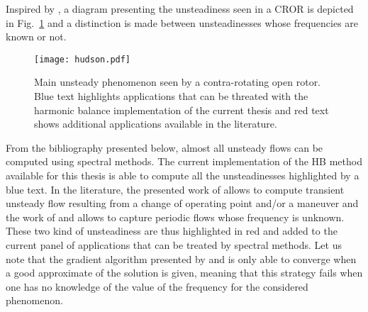 
Inspired by \citet{Hodson1998},
a diagram presenting the unsteadiness seen in 
a CROR is depicted in Fig.~\ref{fig:hudson} and a distinction
is made between unsteadinesses whose frequencies are
known or not.
\begin{figure}[htbp]
  \centering
  \texttt{[image: hudson.pdf]}
  \caption{Main unsteady phenomenon seen by a contra-rotating
  open rotor. Blue text highlights applications that can
  be threated with the harmonic balance implementation of the
  current thesis and red text shows additional applications
  available in the literature.}
  \label{fig:hudson}
\end{figure}
From the bibliography presented below, almost all
unsteady flows can be computed using spectral methods.
The current implementation of the HB method available for
this thesis is able to compute all the unsteadinesses highlighted
by a blue text. In the literature, the presented work of 
\citet{Mavriplis2012} allows to compute transient unsteady flow
resulting from a change of operating point and/or a maneuver and
the work of \citet{McMullen2002} and \citet{Gopinath2006} allows
to capture periodic flows whose frequency is unknown. These two
kind of unsteadiness are thus highlighted in red and added
to the current panel of applications that can
be treated by spectral methods. Let us note
that the gradient algorithm presented by \citet{McMullen2002}
and \citet{Gopinath2006} is only able to converge when a 
good approximate of the solution is given, meaning
that this strategy fails when one has no knowledge
of the value of the frequency for the considered phenomenon.